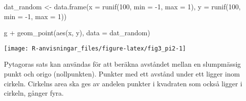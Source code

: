 \documentclass[
]{book}
\newenvironment{Shaded}{\begin{snugshade}}{\end{snugshade}}
\newcommand{\AttributeTok}[1]{\textcolor[rgb]{0.77,0.63,0.00}{#1}}
\newcommand{\DecValTok}[1]{\textcolor[rgb]{0.00,0.00,0.81}{#1}}
\newcommand{\FunctionTok}[1]{\textcolor[rgb]{0.00,0.00,0.00}{#1}}
\newcommand{\NormalTok}[1]{#1}
\newcommand{\OtherTok}[1]{\textcolor[rgb]{0.56,0.35,0.01}{#1}}
\newcommand{\SpecialCharTok}[1]{\textcolor[rgb]{0.00,0.00,0.00}{#1}}
\theoremstyle{definition}
\theoremstyle{definition}
\theoremstyle{definition}
\theoremstyle{definition}
\theoremstyle{remark}
\begin{document}
\begin{Shaded}
\begin{Highlighting}[]
\NormalTok{dat\_random }\OtherTok{\textless{}{-}} \FunctionTok{data.frame}\NormalTok{(}\AttributeTok{x =} \FunctionTok{runif}\NormalTok{(}\DecValTok{100}\NormalTok{, }\AttributeTok{min =} \SpecialCharTok{{-}}\DecValTok{1}\NormalTok{, }\AttributeTok{max =} \DecValTok{1}\NormalTok{),}
                         \AttributeTok{y =} \FunctionTok{runif}\NormalTok{(}\DecValTok{100}\NormalTok{, }\AttributeTok{min =} \SpecialCharTok{{-}}\DecValTok{1}\NormalTok{, }\AttributeTok{max =} \DecValTok{1}\NormalTok{))}

\NormalTok{g }\SpecialCharTok{+} \FunctionTok{geom\_point}\NormalTok{(}\FunctionTok{aes}\NormalTok{(x, y), }\AttributeTok{data =}\NormalTok{ dat\_random)}
\end{Highlighting}
\end{Shaded}

\begin{center}\texttt{[image: R-anvisningar\_files/figure-latex/fig3\_pi2-1]} \end{center}

Pytagoras sats kan användas för att beräkna avståndet mellan en slumpmässig punkt och origo (nollpunkten). Punkter med ett avstånd under ett ligger inom cirkeln. Cirkelns area ska ges av andelen punkter i kvadraten som också ligger i cirkeln, gånger fyra.

\begin{Shaded}
\end{Shaded}
\end{document}
